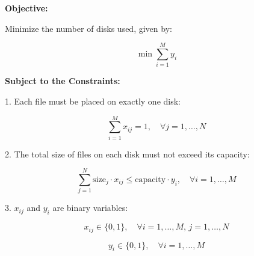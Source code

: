 \documentclass{article}
\begin{document}
\textbf{Objective:}

Minimize the number of disks used, given by:

\[
\min \sum_{i=1}^{M} y_i
\]

\textbf{Subject to the Constraints:}

1. Each file must be placed on exactly one disk:

\[
\sum_{i=1}^{M} x_{ij} = 1, \quad \forall j = 1, \ldots, N
\]

2. The total size of files on each disk must not exceed its capacity:

\[
\sum_{j=1}^{N} \text{size}_j \cdot x_{ij} \leq \text{capacity} \cdot y_i, \quad \forall i = 1, \ldots, M
\]

3. \( x_{ij} \) and \( y_i \) are binary variables:

\[
x_{ij} \in \{0, 1\}, \quad \forall i = 1, \ldots, M, \, j = 1, \ldots, N
\]

\[
y_i \in \{0, 1\}, \quad \forall i = 1, \ldots, M
\]
\end{document}
